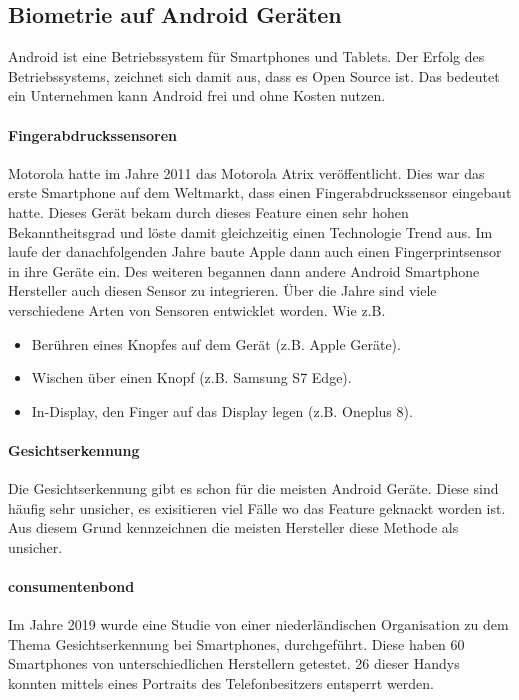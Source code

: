 \subsection{Biometrie auf Android Geräten}
Android ist eine Betriebssystem für Smartphones und Tablets. Der Erfolg des Betriebssystems, zeichnet sich damit aus, dass es Open Source ist. Das bedeutet ein Unternehmen kann Android frei und ohne Kosten nutzen.
\paragraph{Fingerabdruckssensoren}
Motorola hatte im Jahre 2011 das Motorola Atrix veröffentlicht. Dies war das erste Smartphone auf dem Weltmarkt, dass einen Fingerabdruckssensor eingebaut hatte.
Dieses Gerät bekam durch dieses Feature einen sehr hohen Bekanntheitsgrad und löste damit gleichzeitig einen Technologie Trend aus.
Im laufe der danachfolgenden Jahre baute Apple dann auch einen Fingerprintsensor in ihre Geräte ein. Des weiteren begannen dann andere Android Smartphone Hersteller auch diesen Sensor zu integrieren.
Über die Jahre sind viele verschiedene Arten von Sensoren entwicklet worden. Wie z.B.
\begin{itemize}
	\item Berühren eines Knopfes auf dem Gerät (z.B. Apple Geräte).
	\item Wischen über einen Knopf (z.B. Samsung S7 Edge).
	\item In-Display, den Finger auf das Display legen (z.B. Oneplus 8). 
\end{itemize}
\paragraph{Gesichtserkennung}
Die Gesichtserkennung gibt es schon für die meisten Android Geräte. Diese sind häufig sehr unsicher, es exisitieren viel Fälle wo das Feature geknackt worden ist. Aus diesem Grund kennzeichnen die meisten Hersteller diese Methode als unsicher. 
\\
\paragraph{consumentenbond}
Im Jahre 2019 wurde eine Studie von einer niederländischen Organisation zu dem Thema Gesichtserkennung bei Smartphones, durchgeführt. 
Diese haben 60 Smartphones von unterschiedlichen Herstellern getestet. 26 dieser Handys konnten mittels eines Portraits des Telefonbesitzers entsperrt werden.

